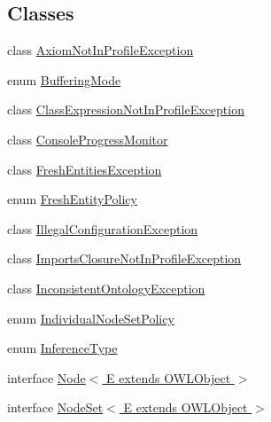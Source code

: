 \subsection*{Classes}
\begin{DoxyCompactItemize}
\item 
class \hyperlink{classorg_1_1semanticweb_1_1owlapi_1_1reasoner_1_1_axiom_not_in_profile_exception}{Axiom\-Not\-In\-Profile\-Exception}
\item 
enum \hyperlink{enumorg_1_1semanticweb_1_1owlapi_1_1reasoner_1_1_buffering_mode}{Buffering\-Mode}
\item 
class \hyperlink{classorg_1_1semanticweb_1_1owlapi_1_1reasoner_1_1_class_expression_not_in_profile_exception}{Class\-Expression\-Not\-In\-Profile\-Exception}
\item 
class \hyperlink{classorg_1_1semanticweb_1_1owlapi_1_1reasoner_1_1_console_progress_monitor}{Console\-Progress\-Monitor}
\item 
class \hyperlink{classorg_1_1semanticweb_1_1owlapi_1_1reasoner_1_1_fresh_entities_exception}{Fresh\-Entities\-Exception}
\item 
enum \hyperlink{enumorg_1_1semanticweb_1_1owlapi_1_1reasoner_1_1_fresh_entity_policy}{Fresh\-Entity\-Policy}
\item 
class \hyperlink{classorg_1_1semanticweb_1_1owlapi_1_1reasoner_1_1_illegal_configuration_exception}{Illegal\-Configuration\-Exception}
\item 
class \hyperlink{classorg_1_1semanticweb_1_1owlapi_1_1reasoner_1_1_imports_closure_not_in_profile_exception}{Imports\-Closure\-Not\-In\-Profile\-Exception}
\item 
class \hyperlink{classorg_1_1semanticweb_1_1owlapi_1_1reasoner_1_1_inconsistent_ontology_exception}{Inconsistent\-Ontology\-Exception}
\item 
enum \hyperlink{enumorg_1_1semanticweb_1_1owlapi_1_1reasoner_1_1_individual_node_set_policy}{Individual\-Node\-Set\-Policy}
\item 
enum \hyperlink{enumorg_1_1semanticweb_1_1owlapi_1_1reasoner_1_1_inference_type}{Inference\-Type}
\item 
interface \hyperlink{interfaceorg_1_1semanticweb_1_1owlapi_1_1reasoner_1_1_node_3_01_e_01extends_01_o_w_l_object_01_4}{Node$<$ E extends O\-W\-L\-Object $>$}
\item 
interface \hyperlink{interfaceorg_1_1semanticweb_1_1owlapi_1_1reasoner_1_1_node_set_3_01_e_01extends_01_o_w_l_object_01_4}{Node\-Set$<$ E extends O\-W\-L\-Object $>$}
\item 

\end{DoxyCompactItemize}
